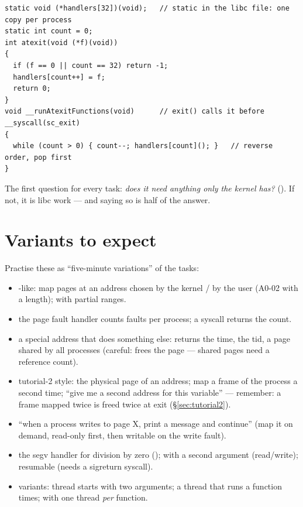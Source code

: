 \begin{lstlisting}[style=cpp]
static void (*handlers[32])(void);   // static in the libc file: one copy per process
static int count = 0;
int atexit(void (*f)(void))
{
  if (f == 0 || count == 32) return -1;
  handlers[count++] = f;
  return 0;
}
void __runAtexitFunctions(void)      // exit() calls it before __syscall(sc_exit)
{
  while (count > 0) { count--; handlers[count](); }   // reverse order, pop first
}
\end{lstlisting}

The first question for every task: \emph{does it need anything only the kernel has?}
(). If not, it is libc work --- and saying so is half of the answer.

\section{Variants to expect}

Practise these as ``five-minute variations'' of the tasks:
\begin{itemize}
\item {}-like: map  pages at an address chosen by the kernel / by the user
  (A0-02 with a length);  with partial ranges.
\item the page fault handler counts faults per process; a syscall returns the count.
\item a special address that does something else: returns the time, the tid, a page shared by
  all processes (careful:  frees the page --- shared pages need a reference count).
\item tutorial-2 style: the physical page of an address; map a frame of the process a second
  time; ``give me a second address for this variable'' --- remember: a frame mapped twice is
  freed twice at exit (\S\ref{sec:tutorial2}).
\item ``when a process writes to page X, print a message and continue'' (map it on demand,
  read-only first, then writable on the write fault).
\item the segv handler for division by zero (); with a second argument
  (read/write); resumable (needs a sigreturn syscall).
\item {} variants: thread starts with two arguments; a thread that runs a
  function  times;  with one thread \emph{per} function.
\end{itemize}
